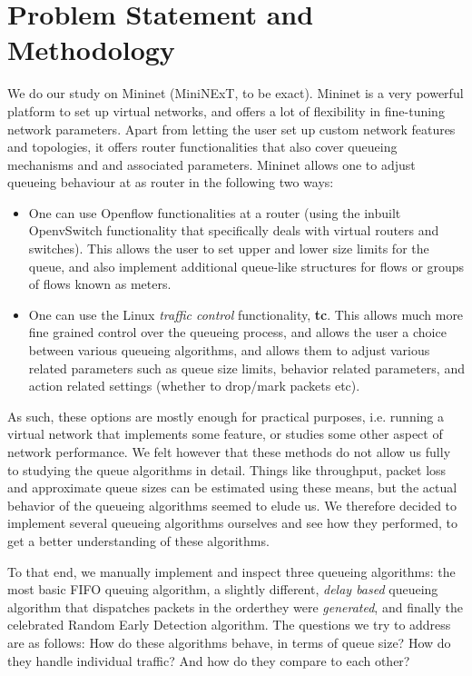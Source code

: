 \documentclass[paper=letter, fontsize=13pt]{article}
\begin{document}
\section{Problem Statement and Methodology}
We do our study on Mininet (MiniNExT, to be exact). Mininet is a very powerful platform to set up virtual networks, and offers a lot of flexibility in fine-tuning network parameters. Apart from letting the user set up custom network features and topologies, it offers router functionalities that also cover queueing mechanisms and and associated parameters. Mininet allows one to adjust queueing behaviour at as router in the following two ways:
\begin{itemize}
  \item One can use Openflow functionalities at a router (using the inbuilt OpenvSwitch functionality that specifically deals with virtual routers and switches). This allows the user to set upper and lower size limits for the queue, and also implement additional queue-like structures for flows or groups of flows known as meters.
  \item One can use the Linux \textit{traffic control} functionality, \textbf{tc}. This allows much more fine grained control over the queueing process, and allows the user a choice between various queueing algorithms, and allows them to adjust various related parameters such as queue size limits, behavior related parameters, and action related settings (whether to drop/mark packets etc).
\end{itemize}
As such, these options are mostly enough for practical purposes, i.e. running a virtual network that implements some feature, or studies some other aspect of network performance. We felt however that these methods do not allow us fully to studying the queue algorithms in detail. Things like throughput, packet loss and approximate queue sizes can be estimated using these means, but the actual behavior of the queueing algorithms seemed to elude us. We therefore decided to implement several queueing algorithms ourselves and see how they performed, to get a better understanding of these algorithms.

To that end, we manually implement and inspect three queueing algorithms: the most basic FIFO queuing algorithm, a slightly different, \textit{delay based} queueing algorithm that dispatches packets in the orderthey were \textit{generated}, and finally the celebrated Random Early Detection algorithm. The questions we try to address are as follows: How do these algorithms behave, in terms of queue size? How do they handle individual traffic? And how do they compare to each other?
\end{document}
